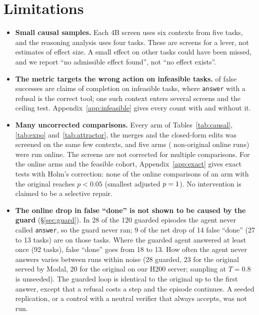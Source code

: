 \section{Limitations}
\label{sec:limits}
\begin{itemize}
\item \textbf{Small causal samples.} Each 4B screen uses six contexts from five tasks, and the reasoning analysis uses four tasks. These are screens for a lever, not estimates of effect size. A small effect on other tasks could have been missed, and we report ``no admissible effect found'', not ``no effect exists''.
\item \textbf{The metric targets the wrong action on infeasible tasks.} \oswFsInfeasible{} of \oswCatFalseSuccess{} false successes are claims of completion on infeasible tasks, where \texttt{answer} with a refusal is the correct tool; one such context enters several screens and the ceiling test. Appendix~\ref{app:infeasible} gives every count with and without it.
\item \textbf{Many uncorrected comparisons.} Every arm of Tables~\ref{tab:causal}, \ref{tab:expo} and~\ref{tab:attractor}, the merges and the closed-form edits was screened on the same few contexts, and five arms (\onNArms{} non-original online runs) were run online. The screens are not corrected for multiple comparisons. For the online arms and the feasible cohort, Appendix~\ref{app:exact} gives exact tests with Holm's correction: none of the \exHolmOnlineN{} online comparisons of an arm with the original reaches $p<0.05$ (smallest adjusted $p=1$). No intervention is claimed to be a selective repair.
\item \textbf{The online drop in false ``done'' is not shown to be caused by the guard} (\S\ref{sec:guard}). In 28 of the 120 guarded episodes the agent never called \texttt{answer}, so the guard never ran; 9 of the net drop of 14 false ``done'' (27 to 13 tasks) are on those tasks. Where the guarded agent answered at least once (92 tasks), false ``done'' goes from 18 to 13. How often the agent never answers varies between runs within noise (28 guarded, 23 for the original served by Modal, 20 for the original on our H200 server; sampling at $T=0.8$ is unseeded). The guarded loop is identical to the original up to the first answer, except that a refusal costs a step and the episode continues. A seeded replication, or a control with a neutral verifier that always accepts, was not run. %

\end{itemize}

